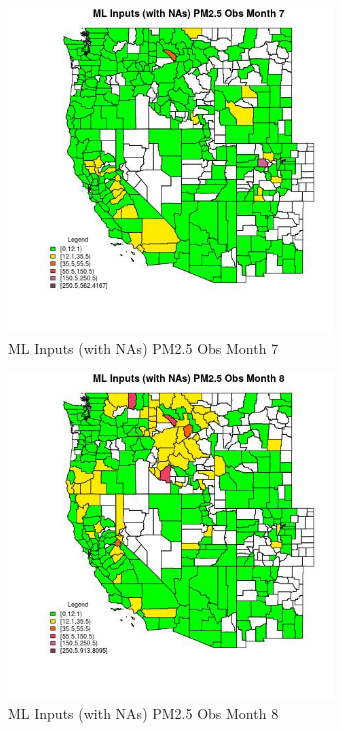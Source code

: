 \begin{figure} 
\centering  
\includegraphics[width=0.77\textwidth]{Code_Outputs/Report_ML_input_PM25_Step4_part_e_de_duplicated_aves_compiled_2019-05-20wNAs_CountyPM25_ObsmedianMonth7.jpg} 
\caption{\label{fig:Report_ML_input_PM25_Step4_part_e_de_duplicated_aves_compiled_2019-05-20wNAsCountyPM25_ObsmedianMonth7}ML Inputs (with NAs) PM2.5 Obs Month 7} 
\end{figure} 
 

\begin{figure} 
\centering  
\includegraphics[width=0.77\textwidth]{Code_Outputs/Report_ML_input_PM25_Step4_part_e_de_duplicated_aves_compiled_2019-05-20wNAs_CountyPM25_ObsmedianMonth8.jpg} 
\caption{\label{fig:Report_ML_input_PM25_Step4_part_e_de_duplicated_aves_compiled_2019-05-20wNAsCountyPM25_ObsmedianMonth8}ML Inputs (with NAs) PM2.5 Obs Month 8} 
\end{figure} 
 

